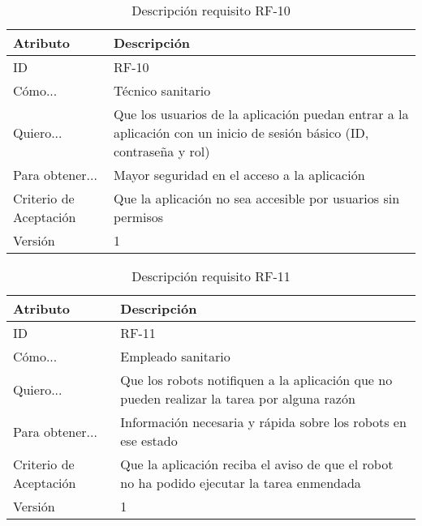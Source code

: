 \begin{table}[H]
    \label{tab:reqF10}
 	\caption{Descripción requisito RF-10}
	\centering

	\begin{tabular}{C{3cm}|C{12cm}}
 		\toprule
 		\textbf{Atributo} & \textbf{Descripción} \\
 		\midrule
 	    ID & RF-10 \\
 	    Cómo... & Técnico sanitario \\
 	    Quiero... & Que los usuarios de la aplicación puedan entrar a la aplicación con un inicio de sesión básico (ID, contraseña y rol) \\
 	    Para obtener... & Mayor seguridad en el acceso a la aplicación  \\
 	    Criterio de Aceptación & Que la aplicación no sea accesible por usuarios sin permisos \\
 	    Versión & 1 \\
 		\bottomrule
 		\end{tabular}
\end{table}

\begin{table}[H]
    \label{tab:reqF11}
 	\caption{Descripción requisito RF-11}
	\centering

	\begin{tabular}{C{3cm}|C{12cm}}
 		\toprule
 		\textbf{Atributo} & \textbf{Descripción} \\
 		\midrule
 	    ID & RF-11 \\
 	    Cómo... & Empleado sanitario \\
 	    Quiero... & Que los robots notifiquen a la aplicación que no pueden realizar la tarea por alguna razón \\
 	    Para obtener... & Información necesaria y rápida sobre los robots en ese estado  \\
 	    Criterio de Aceptación & Que la aplicación reciba el aviso de que el robot no ha podido ejecutar la tarea enmendada \\
 	    Versión & 1 \\
 		\bottomrule
 		\end{tabular}
\end{table}

